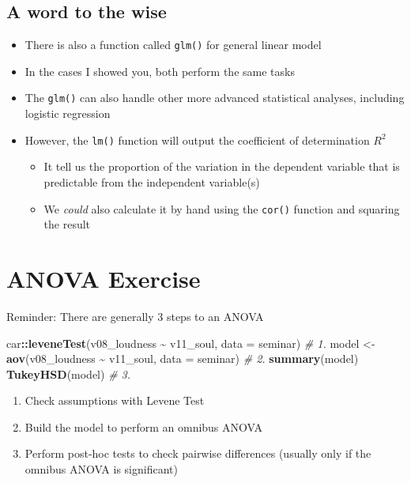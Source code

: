 \documentclass[
]{book}
\newenvironment{Shaded}{\begin{snugshade}}{\end{snugshade}}
\newcommand{\AttributeTok}[1]{\textcolor[rgb]{0.13,0.29,0.53}{#1}}
\newcommand{\CommentTok}[1]{\textcolor[rgb]{0.56,0.35,0.01}{\textit{#1}}}
\newcommand{\FunctionTok}[1]{\textcolor[rgb]{0.13,0.29,0.53}{\textbf{#1}}}
\newcommand{\NormalTok}[1]{#1}
\newcommand{\OtherTok}[1]{\textcolor[rgb]{0.56,0.35,0.01}{#1}}
\newcommand{\SpecialCharTok}[1]{\textcolor[rgb]{0.81,0.36,0.00}{\textbf{#1}}}
\providecommand{\tightlist}{%
  \setlength{\itemsep}{0pt}\setlength{\parskip}{0pt}}
\begin{document}
\subsection{A word to the wise}\label{a-word-to-the-wise}

\begin{itemize}
\tightlist
\item
  There is also a function called \texttt{glm()} for general linear model
\item
  In the cases I showed you, both perform the same tasks
\item
  The \texttt{glm()} can also handle other more advanced statistical analyses, including logistic regression
\item
  However, the \texttt{lm()} function will output the coefficient of determination \(R^2\)

  \begin{itemize}
  \tightlist
  \item
    It tell us the proportion of the variation in the dependent variable that is predictable from the independent variable(s)
  \item
    We \emph{could} also calculate it by hand using the \texttt{cor()} function and squaring the result
  \end{itemize}
\end{itemize}

\section{ANOVA Exercise}\label{anova-exercise}

Reminder: There are generally 3 steps to an ANOVA

\begin{Shaded}
\begin{Highlighting}[]
\NormalTok{car}\SpecialCharTok{::}\FunctionTok{leveneTest}\NormalTok{(v08\_loudness }\SpecialCharTok{\textasciitilde{}}\NormalTok{ v11\_soul, }\AttributeTok{data =}\NormalTok{ seminar) }\CommentTok{\# 1.}
\NormalTok{model }\OtherTok{\textless{}{-}} \FunctionTok{aov}\NormalTok{(v08\_loudness }\SpecialCharTok{\textasciitilde{}}\NormalTok{ v11\_soul, }\AttributeTok{data =}\NormalTok{ seminar) }\CommentTok{\# 2.}
\FunctionTok{summary}\NormalTok{(model)}
\FunctionTok{TukeyHSD}\NormalTok{(model) }\CommentTok{\# 3.}
\end{Highlighting}
\end{Shaded}

\begin{enumerate}
\def\labelenumi{\arabic{enumi}.}
\tightlist
\item
  Check assumptions with Levene Test
\item
  Build the model to perform an omnibus ANOVA
\item
  Perform post-hoc tests to check pairwise differences (usually only if the omnibus ANOVA is significant)
\end{enumerate}
\end{document}
